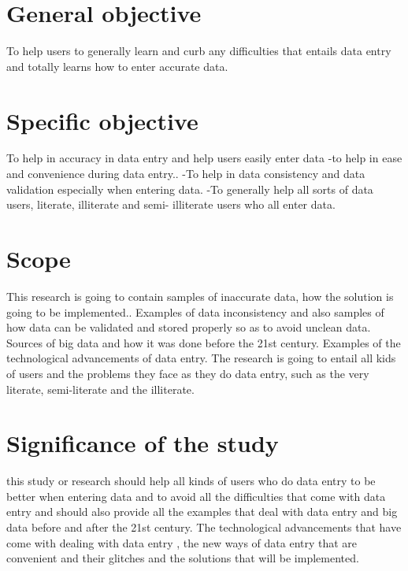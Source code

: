 \documentclass[12pt,]{article}
\begin{document}
\section{General objective}
To help users to generally learn and curb any difficulties that entails data entry and totally learns how to enter accurate data.

\section{Specific objective}
To help in accuracy in data entry and help users easily enter data
-to help in ease and convenience during data entry..
-To help in data consistency and data validation especially when entering data.
-To generally help all sorts of data users, literate, illiterate and semi- illiterate users who all enter data.

\section{Scope}
This research is going to contain samples of inaccurate data, how the solution is going to be implemented.. Examples of data inconsistency and also samples of how data can be validated and stored properly so as to avoid unclean data. Sources of big data and how it was done before the 21st century. Examples of the technological advancements of data entry. The research is going to entail all kids of users and the problems they face as they do data entry, such as the very literate, semi-literate and the illiterate.
  
\section{Significance of the study}this study or research should help all kinds of users who do data entry to be better when entering data and to avoid all the difficulties that come with data entry and should also provide all the examples that deal with data entry and big data  before and after the 21st century. The technological advancements that have come with dealing with data entry , the new ways of data entry that are convenient and their glitches and the solutions that will be implemented.
\end{document}
